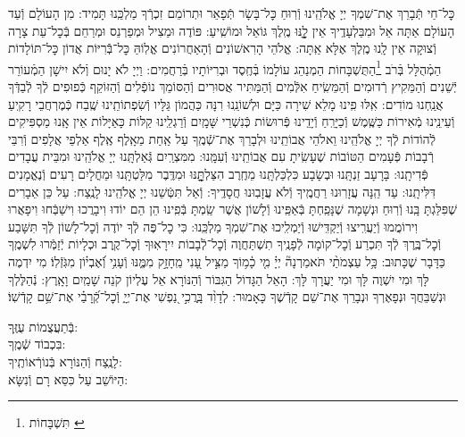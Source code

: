 \documentclass[twoside, openany, parskip=half, 11pt]{book}
\begin{document}
\label{nishmas}
 כׇּל־חַי תְּֿבָרֵךְ אֶת־שִׁמְךָ יְיָ אֱלֹהֵֽינוּ וְֿרֽוּחַ כׇּל־בָּשָׂר תְּֿפָאֵר וּתְרוֹמֵם זִכְרְֿךָ מַלְכֵּֽנוּ תָּמִיד: מִן הָעוֹלָם וְֿעַד הָעוֹלָם אַתָּה אֵל וּמִבַּלְעָדֶֽיךָ אֵין לׇׇׇׇָֽנּוּ מֶֽלֶךְ גּוֹאֵל וּמוֹשִֽׁיעַ:
פּוֹדֶה וּמַצִיל וּמְפַרְנֵס וּמְרַחֵם בְּֿכׇל־עֵת צָרָה וְֿצוּקָה אֵין לָֽנוּ מֶֽלֶךְ אֶלָּא אַֽתָּה: אֱלֹהֵי הָרִאשׁוֹנִים וְֿהָאַחֲרוֹנִים אֱלֽוֹהַּ כׇּל־בְּֿֿרִיּוֹת אֲדוֹן כׇּל־תּוֹלָדוֹת הַמְֿהֻלָּל בְּֿרֹב \footnote{תִּשְׁבָּחוֹת \label{xx}}הַתֻּשְׁבָּחוֹת הַמְנַהֵג עוֹלָמוֹ בְּֿחֶֽסֶד וּבְרִיּוֹתָיו בְּֿרַחֲמִים: וַיְיָ לֹא יָנוּם וְֿלֹא יִישָׁן הַמְֿעוֹרֵר יְֿשֵׁנִים וְֿהַמֵּקִיץ רְֿדוּמִים וְֿהַמֵּשִֽׂיחַ אִלְּֿמִים וְֿהַמַּתִּיר אֲסוּרִים וְֿהַסּוֹמֵךְ נוֹפְֿלִים וְֿהַזּוֹקֵף כְּֿפוּפִים לְֿךָ לְֿבַדְּֿךָ אֲנַֽחְנוּ מוֹדִים: אִֽלּוּ פִֽינוּ מָלֵא שִׁירָה כַּיָּם וּלְשׁוֹנֵֽנוּ רִנָּה כַּהֲמוֹן גַּלָּיו וְֿשִׂפְתוֹתֵֽינוּ שֶֽׁבַח כְּֿמֶרְחֲבֵי רָקִֽיעַ וְֿעֵינֵֽינוּ מְֿאִירוֹת כַּשֶּֽׁמֶשׁ וְֿכַיָּרֵֽחַ וְֿיָדֵֽינוּ פְּֿרוּשׂוֹת כְּֿנִשְׁרֵי שָּׁמָֽיִם וְֿרַגְלֵֽינוּ קַלּוֹת כָּאַיָּלוֹת אֵין אָֽנוּ מַסְפִּיקִים לְֿהוֹדוֹת לְֿךָ יְיָ אֱלֹהֵֽינוּ וֵאלֹהֵי אֲבוֹתֵֽינוּ וּלְבָרֵךְ אֶת־שְֿׁמֶֽךָ עַל אַֽחַת מֵאָֽלֶף אֶֽלֶף אַלְפֵי אֲלָפִים וְֿרִבֵּי רְֿבָבוֹת פְּֿעָמִים הַטּוֹבוֹת שֶׁעָשִֽׂיתָ עִם אֲבוֹתֵֽינוּ וְֿעִמָּֽנוּ: מִמִּצְרַֽיִם גְּֿאַלְתָּֽנוּ יְיָ אֱלֹהֵֽינוּ וּמִבֵּית עֲבָדִים פְּֿדִיתָֽנוּ: בָּרָעָב זַנְתָּֽנוּ וּבְשָׂבָע כִּלְכַּלְתָּֽנוּ מֵחֶֽרֶב הִצַּלְתׇׇׇׇָּֽנּוּ וּמִדֶּֽבֶר מִלַּטְתָּֽנוּ וּמֵחֳלָיִם רָעִים וְֿנֶאֱמָנִים דִּלִּיתָֽנוּ: עַד הֵֽנָּה עֲזָרֽוּנוּ רַחֲמֶֽיךָ וְֿלֹא עֲזָבֽוּנוּ חֲסָדֶֽיךָ: וְֿאַל תִּטְּֿשֵׁנוּ יְיָ אֱלֹהֵֽינוּ לָנֶֽצַח: עַל כֵּן אֵבָרִים שֶׁפִּלַּגְתָּ בָּֽנוּ וְֿרֽוּחַ וּנְשָׁמָה שֶׁנָּפַֽחְתָּ בְּֿאַפֵּֽינוּ וְֿלָשׁוֹן אֲשֶׁר שַֽׂמְתָּ בְּֿפִֽינוּ הֵן הֵם יוֹדוּ וִיבָרֲכוּ וִישַׁבְּֿחוּ וִיפָאֲרוּ וִירוֹמֲמוּ וְֿיַעֲרִֽיצוּ וְֿיַקְדִּֽישׁוּ וְֿיַמְלִֽיכוּ אֶת־שִׁמְךָ מַלְכֵּֽנוּ: כִּי כׇל־פֶּה לְֿךָ יוֹדֶה וְֿכׇל־לָשׁוֹן לְֿךָ תִּשָּׁבַע וְֿכׇל־בֶּֽרֶךְ לְֿךָ תִּכְרַע וְֿכׇל־קוֹמָה לְֿפָנֶֽיךָ תִשְׁתַּחֲוֶה וְֿכׇל־לְֿבָבוֹת יִירָאֽוּךָ וְֿכׇל־קֶֽרֶב וּכְלָיוֹת יְֿזַמְּֿרוּ לִשְׁמֶֽךָ כַּדָּבָר שֶׁכָּתוּב:
 כָּ֥ל עַצְמֹתַ֨י תֹּאמַרְנָה֘ יְיָ֗ מִ֤י כָ֫מ֥וֹךָ מַצִּ֣יל עָ֭נִי מֵֽחָזָ֣ק מִמֶּ֑נּוּ וְֿעָנִ֥י וְֿ֝אֶבְי֗וֹן מִגֹּֽזְֿלֽוֹ׃ מִי יִדְמֶה לָּךְ וּמִי יִשְׁוֶה לָּךְ וּמִי יַעֲרָךְ לָּךְ: הָאֵל הַגָּדוֹל הַגִּבּוֹר וְֿהַנּוֹרָא אֵל עֶלְיוֹן קֹנֵה שָׁמַֽיִם וָאָֽרֶץ:
 נְֿהַלֶּלְךָ וּנְשַׁבֵּחֲךָ וּנְפָאֶרְךָ וּנְבָרֵךְ אֶת־שֵׁם קָדְֿשֶׁךָ כָּאָמוּר:
לְדָוִ֨ד בָּֽרֲכִ֣י נַ֭פְשִׁי אֶת־יְיָ֑ וְֿכׇל־קְֿ֝רָבַ֗י אֶת־שֵׁ֥ם קָדְֿשֽׁוֹ׃


 בְּֿתַעֲצֻמוֹת עֻזֶּֽךָ:\\
 בִּכְבוֹד שְֿׁמֶֽךָ:\\
 לָנֶֽצַח וְֿהַנּוֹרָא בְּֿנוֹרְֿאוֹתֶֽיךָ:\\
 הַיּוֹשֵׁב עַל כִּסֵּא רָם וְֿנִשָּׂא:
\end{document}

